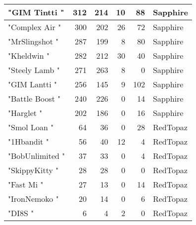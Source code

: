 \documentclass{article}
\begin{document}
\begin{table}[htbp]
\begin{tabular}{|l|r|r|r|r|l|}
"GIM Tintti " & 312 & 214 & 10 & 88 & Sapphire \\ \hline
"Complex Air " & 300 & 202 & 26 & 72 & Sapphire \\ \hline
"MrSlingshot " & 287 & 199 & 8 & 80 & Sapphire \\ \hline
"Kheldwin " & 282 & 212 & 30 & 40 & Sapphire \\ \hline
"Steely Lamb " & 271 & 263 & 8 & 0 & Sapphire \\ \hline
"GIM Lantti " & 256 & 145 & 9 & 102 & Sapphire \\ \hline
"Battle Boost " & 240 & 226 & 0 & 14 & Sapphire \\ \hline
"Harglet " & 202 & 186 & 0 & 16 & Sapphire \\ \hline
"Smol Loan " & 64 & 36 & 0 & 28 & RedTopaz \\ \hline
"1Hbandit " & 56 & 40 & 12 & 4 & RedTopaz \\ \hline
"BobUnlimited " & 37 & 33 & 0 & 4 & RedTopaz \\ \hline
"SkippyKitty " & 28 & 28 & 0 & 0 & RedTopaz \\ \hline
"Fast Mi " & 27 & 13 & 0 & 14 & RedTopaz \\ \hline
"IronNemoko " & 20 & 14 & 0 & 6 & RedTopaz \\ \hline
"DI8S " & 6 & 4 & 2 & 0 & RedTopaz \\ \hline
\end{tabular}
\end{table}
\end{document}

